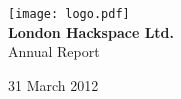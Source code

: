 


\begin{titlepage}
\begin{center}
\texttt{[image: logo.pdf]}\\[48pt]
{\bf \LARGE London Hackspace Ltd.}\\[36pt]
{\Large Annual Report}

\vfill
31 March 2012

\end{center}
\end{titlepage}







